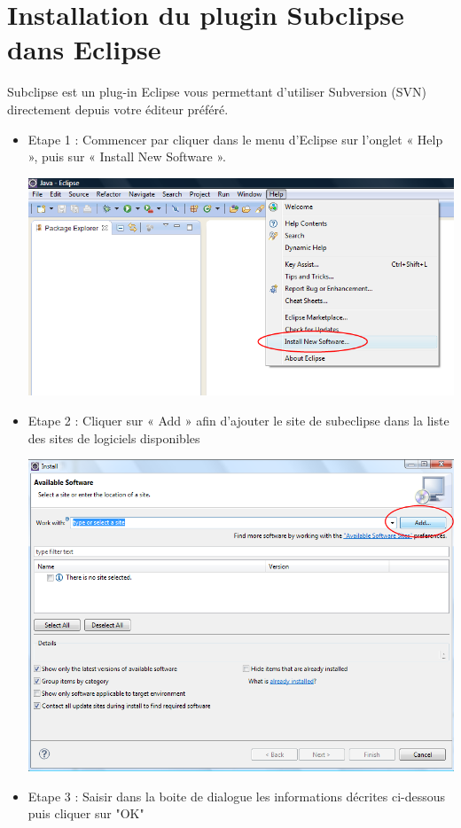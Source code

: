 % 

\section{Installation du plugin Subclipse dans Eclipse}

Subclipse est un plug-in Eclipse vous permettant d'utiliser Subversion (SVN) directement depuis votre \'editeur pr\'ef\'er\'e.

\begin{itemize}[leftmargin=* ,parsep=0cm,itemsep=0cm,topsep=0cm]

\medskip

\item Etape 1 : Commencer par cliquer dans le menu d’Eclipse sur l'onglet « Help », puis sur « Install New Software ».
\begin{center}
\includegraphics[width=0.4\linewidth]{../../resources/images/guide_installation/pluginInstall.png}
\end{center}

\item Etape 2 : Cliquer sur « Add » afin d’ajouter le site de subeclipse dans la liste des sites de logiciels disponibles
\begin{center}
\includegraphics[width=0.4\linewidth]{../../resources/images/guide_installation/pluginNewUrl.png}
\end{center}

\item Etape 3 : Saisir dans la boite de dialogue les informations d\'ecrites ci-dessous puis cliquer sur "OK"\\


\end{itemize}
